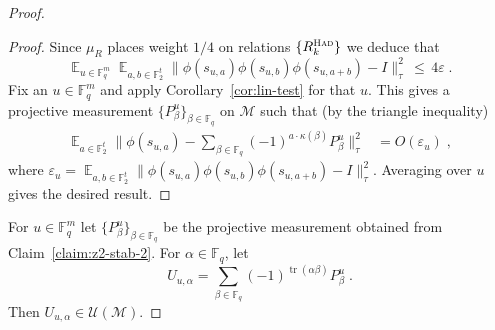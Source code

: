 \documentclass[11pt]{article}
\theoremstyle{definition}
\newcommand{\Id}{\ensuremath{I}}
\DeclareMathOperator*{\Expectation}{\mathbb{E}}
\newcommand{\Es}[1]{\Expectation_{#1}}
\newcommand{\F}{\ensuremath{\mathbb{F}}}
\newcommand{\mM}{\ensuremath{\mathcal{M}}}
\newcommand{\mU}{\ensuremath{\mathcal{U}}}
\newcommand{\had}{\textsc{Had}}
\newcommand{\eps}{\varepsilon}
\DeclareMathOperator{\tr}{tr}
\begin{document}
\begin{proof}
\begin{proof}
Since $\mu_R$ places weight $1/4$ on relations $\{R^\had_k\}$ we deduce that 
\begin{equation}\label{eq:stab-rm-1}
\Es{u\in \F_q^m} \Es{a,b\in \F_2^t} \big\|\phi(s_{u,a})\phi(s_{u,b})\phi(s_{u,a+b})-\Id\big\|_\tau^2 \,\leq\, 4\eps\;. 
\end{equation}
Fix an $u\in \F_q^m$ and apply Corollary~\ref{cor:lin-test} for that $u$. This gives a projective measurement $\{P^u_\beta\}_{\beta\in \F_q}$ on $\mM$ such that (by the triangle inequality)
\begin{align*}
 \Es{a \in \F_2^t} \Big\| \phi(s_{u,a}) - \sum_{\beta\in\F_q} (-1)^{a \cdot \kappa(\beta)} P^u_\beta \Big\|_\tau^2
&= O(\eps_u)\;,
\end{align*}
where $\eps_u=\Es{a,b\in \F_2^t}\|\phi(s_{u,a})\phi(s_{u,b})\phi(s_{u,a+b})-\Id\|_\tau^2$.
Averaging over $u$ gives the desired result.
\end{proof}

For $u\in \F_q^m$ let $\{P^{u}_\beta\}_{\beta \in \F_q}$ be the projective measurement obtained from Claim~\ref{claim:z2-stab-2}. For $\alpha\in \F_q$, let  
\[ U_{u,\alpha} = \sum_{\beta\in\F_q} (-1)^{\tr(\alpha\beta)} P^u_{\beta}\;.\]
Then $U_{u,\alpha} \in \mU(\mM)$. 


\end{proof}
\end{document}

